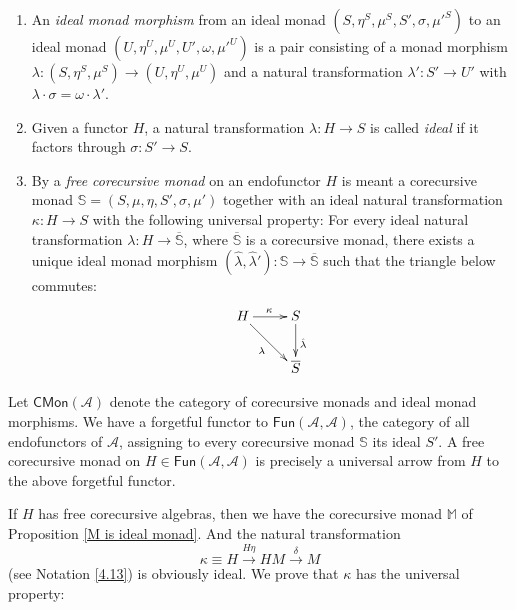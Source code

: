 \documentclass{LMCS}
\theoremstyle{plain}
\theoremstyle{definition}
\numberwithin{equation}{section}
\begin{document}
\begin{defi}\hfill
\begin{enumerate}[label=\({\alph*}]
\item An {\it ideal monad morphism} from an ideal monad
  $(S,\eta^S,\mu^S,S',\sigma,\mu'^S)$ to an ideal monad
  $(U,\eta^U,\mu^U,U',\omega,\mu'^U)$ is a pair consisting of a monad
  morphism $\lambda:(S,\eta^S,\mu^S)\rightarrow (U,\eta^U,\mu^U)$ and
  a natural transformation $\lambda':S'\rightarrow U'$ with
  $\lambda\cdot\sigma =\omega\cdot \lambda'$.

\item Given a functor $H$, a natural transformation $\lambda:H\rightarrow S$ is called {\it ideal}  if it factors through $\sigma:S'\rightarrow S$.

\item By a {\it free corecursive monad} on an endofunctor $H$ is meant a corecursive monad ${\mathbb S}=(S, \mu, \eta, S',\sigma,\mu')$ together with an ideal natural transformation $\kappa:H\rightarrow S$ with the following universal property:
For every ideal natural transformation $\lambda:H\rightarrow
\overline{\mathbb S}$, where $ \overline{\mathbb S}$ is a corecursive
monad, there exists a unique ideal monad morphism $(\hat{\lambda}, \hat\lambda'):{\mathbb S}\rightarrow \overline{\mathbb S}$ such that the triangle below commutes:
$$\xymatrix{
H\ar[r]^\kappa\ar[rd]_\lambda&S\ar[d]^{\hat{\lambda}}\\
&\overline{S}
}
$$
\end{enumerate}
\end{defi}

\begin{rem}
Let $\mathsf{CMon}(\mathcal A)$ denote the category of corecursive monads and ideal monad morphisms. We have a forgetful functor  to $\mathsf{Fun}(\mathcal A,\mathcal A)$, the category of all endofunctors of $\mathcal A$, assigning to every corecursive monad $\mathbb S$ its ideal $ S'$. A free corecursive monad on $H\in \mathsf{Fun}(\mathcal A, \mathcal A)$ is precisely a universal arrow from $H$ to the above forgetful functor.
\end{rem}


\begin{exa}\label{exam ideal monad}
If $H$ has free corecursive algebras, then we have the corecursive monad $\mathbb M$ of Proposition \ref{M is ideal monad}. And the natural transformation $$\kappa\equiv H\stackrel{H\eta}\longrightarrow HM \stackrel{\delta}\longrightarrow M$$ (see Notation \ref{4.13}) is obviously ideal. We prove that $\kappa$ has the universal property:
\end{exa}
\end{document}
